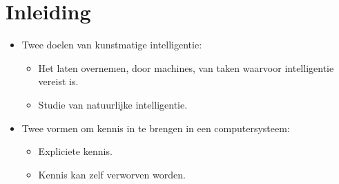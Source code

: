 \documentclass{report}
\begin{document}
\tableofcontents
\chapter{Inleiding}
	\begin{itemize}
		\item Twee doelen van kunstmatige intelligentie:
			\begin{itemize}
			\item Het laten overnemen, door machines, van taken waarvoor intelligentie vereist is.
			\item Studie van natuurlijke intelligentie.
			\end{itemize}
		\item Twee vormen om kennis in te brengen in een computersysteem:
			\begin{itemize}
				\item Expliciete kennis.
				\item Kennis kan zelf verworven worden.
			\end{itemize}
	\end{itemize}
\end{document}
